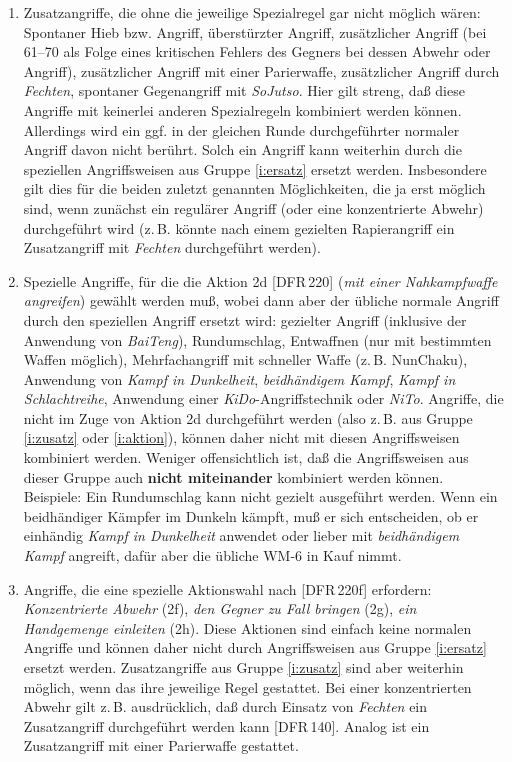 \documentclass[10pt,a4paper,germanpar]{article}
\begin{document}
\begin{enumerate}
\item \label{i:zusatz} Zusatzangriffe, die ohne die jeweilige
  Spezialregel gar nicht möglich wären: Spontaner Hieb bzw. Angriff,
  überstürzter Angriff, zusätzlicher Angriff (bei 61--70 als Folge
  eines kritischen Fehlers des Gegners bei dessen Abwehr oder
  Angriff), zusätzlicher Angriff mit einer Parierwaffe, zusätzlicher
  Angriff durch \emph{Fechten}, spontaner Gegenangriff mit
  \emph{SoJutso}. Hier gilt streng, daß diese Angriffe mit keinerlei
  anderen Spezialregeln kombiniert werden können. Allerdings wird ein
  ggf. in der gleichen Runde durchgeführter normaler Angriff davon
  nicht berührt. Solch ein Angriff kann weiterhin durch die speziellen
  Angriffsweisen aus Gruppe \ref{i:ersatz} ersetzt
  werden. Insbesondere gilt dies für die beiden zuletzt genannten
  Möglichkeiten, die ja erst möglich sind, wenn zunächst ein regulärer
  Angriff (oder eine konzentrierte Abwehr) durchgeführt wird
  (z.\,B. könnte nach einem gezielten Rapierangriff ein Zusatzangriff
  mit \emph{Fechten} durchgeführt werden).
\item \label{i:ersatz} Spezielle Angriffe, für die die Aktion 2d
  [DFR\,220] (\emph{mit einer Nahkampfwaffe angreifen}) gewählt werden
  muß, wobei dann aber der übliche normale Angriff durch den
  speziellen Angriff ersetzt wird: gezielter Angriff (inklusive der
  Anwendung von \emph{BaiTeng}), Rundumschlag, Entwaffnen (nur mit
  bestimmten Waffen möglich), Mehrfachangriff mit schneller Waffe
  (z.\,B. NunChaku), Anwendung von \emph{Kampf in Dunkelheit},
  \emph{beidhändigem Kampf}, \emph{Kampf in Schlachtreihe}, Anwendung
  einer \emph{KiDo}-Angriffstechnik oder \emph{NiTo}. Angriffe, die
  nicht im Zuge von Aktion 2d durchgeführt werden (also z.\,B. aus
  Gruppe \ref{i:zusatz} oder \ref{i:aktion}), können daher nicht mit
  diesen Angriffsweisen kombiniert werden. Weniger offensichtlich ist,
  daß die Angriffsweisen aus dieser Gruppe auch \textbf{nicht
    miteinander} kombiniert werden können. Beispiele: Ein Rundumschlag
  kann nicht gezielt ausgeführt werden. Wenn ein beidhändiger Kämpfer
  im Dunkeln kämpft, muß er sich entscheiden, ob er einhändig
  \emph{Kampf in Dunkelheit} anwendet oder lieber mit
  \emph{beidhändigem Kampf} angreift, dafür aber die übliche WM-6 in
  Kauf nimmt.
\item \label{i:aktion} Angriffe, die eine spezielle Aktionswahl nach
  [DFR\,220f] erfordern: \emph{Konzentrierte Abwehr} (2f), \emph{den
    Gegner zu Fall bringen} (2g), \emph{ein Handgemenge einleiten}
  (2h). Diese Aktionen sind einfach keine normalen Angriffe und können
  daher nicht durch Angriffsweisen aus Gruppe \ref{i:ersatz} ersetzt
  werden. Zusatzangriffe aus Gruppe \ref{i:zusatz} sind aber weiterhin
  möglich, wenn das ihre jeweilige Regel gestattet. Bei einer
  konzentrierten Abwehr gilt z.\,B. ausdrücklich, daß durch Einsatz
  von \emph{Fechten} ein Zusatzangriff durchgeführt werden kann
  [DFR\,140]. Analog ist ein Zusatzangriff mit einer Parierwaffe
  gestattet.
\end{enumerate}
\end{document}
